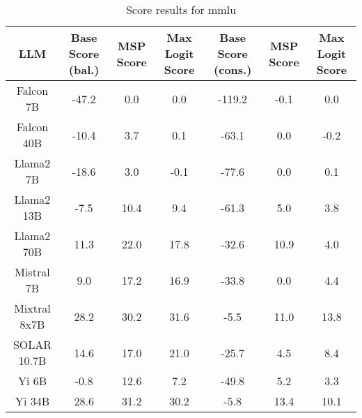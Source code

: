 \renewcommand\arraystretch{1.2}
\begin{table*}
\centering
\begin{tabular}{c|c|c|c|c|c|c}
LLM & Base Score (bal.) & MSP Score & Max Logit Score & Base Score (cons.) & MSP Score & Max Logit Score\\ \hline
Falcon 7B & -47.2 & 0.0 & 0.0 & -119.2 & -0.1 & 0.0\\
Falcon 40B & -10.4 & 3.7 & 0.1 & -63.1 & 0.0 & -0.2\\
Llama2 7B & -18.6 & 3.0 & -0.1 & -77.6 & 0.0 & 0.1\\
Llama2 13B & -7.5 & 10.4 & 9.4 & -61.3 & 5.0 & 3.8\\
Llama2 70B & 11.3 & 22.0 & 17.8 & -32.6 & 10.9 & 4.0\\
Mistral 7B & 9.0 & 17.2 & 16.9 & -33.8 & 0.0 & 4.4\\
Mixtral 8x7B & 28.2 & 30.2 & 31.6 & -5.5 & 11.0 & 13.8\\
SOLAR 10.7B & 14.6 & 17.0 & 21.0 & -25.7 & 4.5 & 8.4\\
Yi 6B & -0.8 & 12.6 & 7.2 & -49.8 & 5.2 & 3.3\\
Yi 34B & 28.6 & 31.2 & 30.2 & -5.8 & 13.4 & 10.1\\
\hline
\end{tabular}
\caption{Score results for mmlu}
\end{table*}
\label{tab:mmlu_score}
